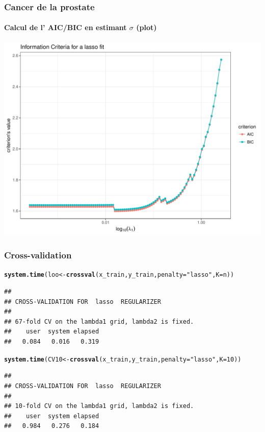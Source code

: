 \documentclass[10pt, c, xcolor=x11names]{beamer}\usepackage[]{graphicx}\usepackage[]{color}
\makeatletter
\newcommand{\hlnum}[1]{\textcolor[rgb]{0.686,0.059,0.569}{#1}}%
\newcommand{\hlstr}[1]{\textcolor[rgb]{0.192,0.494,0.8}{#1}}%
\newcommand{\hlstd}[1]{\textcolor[rgb]{0.345,0.345,0.345}{#1}}%
\newcommand{\hlkwb}[1]{\textcolor[rgb]{0.69,0.353,0.396}{#1}}%
\newcommand{\hlkwc}[1]{\textcolor[rgb]{0.333,0.667,0.333}{#1}}%
\newcommand{\hlkwd}[1]{\textcolor[rgb]{0.737,0.353,0.396}{\textbf{#1}}}%
\newenvironment{kframe}{%
 \def\at@end@of@kframe{}%
 \ifinner\ifhmode%
  \def\at@end@of@kframe{\end{minipage}}%
  \begin{minipage}{\columnwidth}%
 \fi\fi%
 \def\FrameCommand##1{\hskip\@totalleftmargin \hskip-\fboxsep
 \colorbox{shadecolor}{##1}\hskip-\fboxsep
     \hskip-\linewidth \hskip-\@totalleftmargin \hskip\columnwidth}%
 \MakeFramed {\advance\hsize-\width
   \@totalleftmargin\z@ \linewidth\hsize
   \@setminipage}}%
 {\par\unskip\endMakeFramed%
 \at@end@of@kframe}
\newenvironment{knitrout}{}{} %
\makeatother
\begin{document}
\begin{frame}[containsverbatim]
 \frametitle{Cancer de la prostate}
 \framesubtitle{Calcul de l' AIC/BIC en estimant $\sigma$ (plot)}

\begin{knitrout}\scriptsize
{}\color{fgcolor}
\includegraphics[width=.8\textwidth]{figures/lasso_prostateunnamed-chunk-33-1} 

\end{knitrout}
\end{frame}

\begin{frame}[containsverbatim]
  \frametitle{Cross-validation}

\begin{knitrout}\scriptsize
{}\color{fgcolor}\begin{kframe}
\begin{alltt}
\hlkwd{system.time}\hlstd{(loo} \hlkwb{<-} \hlkwd{crossval}\hlstd{(x_train, y_train,} \hlkwc{penalty} \hlstd{=} \hlstr{"lasso"}\hlstd{,} \hlkwc{K} \hlstd{= n))}
\end{alltt}
\begin{verbatim}
## 
## CROSS-VALIDATION FOR  lasso  REGULARIZER 
## 
## 67-fold CV on the lambda1 grid, lambda2 is fixed.
##    user  system elapsed 
##   0.084   0.016   0.319
\end{verbatim}
\end{kframe}
\end{knitrout}

\begin{knitrout}\scriptsize
{}\color{fgcolor}\begin{kframe}
\begin{alltt}
\hlkwd{system.time}\hlstd{(CV10} \hlkwb{<-} \hlkwd{crossval}\hlstd{(x_train, y_train,} \hlkwc{penalty} \hlstd{=} \hlstr{"lasso"}\hlstd{,} \hlkwc{K} \hlstd{=} \hlnum{10}\hlstd{))}
\end{alltt}
\begin{verbatim}
## 
## CROSS-VALIDATION FOR  lasso  REGULARIZER 
## 
## 10-fold CV on the lambda1 grid, lambda2 is fixed.
##    user  system elapsed 
##   0.984   0.276   0.184
\end{verbatim}
\end{kframe}
\end{knitrout}

\end{frame}
\end{document}
